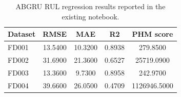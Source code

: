 \begin{table}[!t]
\centering
\caption{ABGRU RUL regression results reported in the existing notebook.}
\label{tab:abgru\_regression}
\begin{tabular}{lcccc}
\hline
Dataset & RMSE & MAE & R2 & PHM score \\
\hline
FD001 & 13.5400 & 10.3200 & 0.8938 & 279.8500 \\
FD002 & 31.6900 & 21.3600 & 0.6527 & 25719.0900 \\
FD003 & 13.3600 & 9.7300 & 0.8958 & 242.9700 \\
FD004 & 39.6600 & 26.0500 & 0.4709 & 1126946.5000 \\
\hline
\end{tabular}
\end{table}
